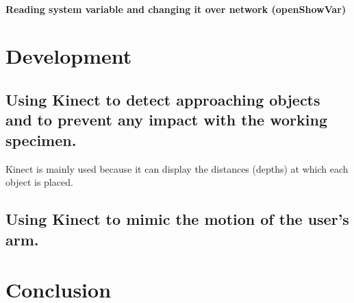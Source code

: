 \documentclass{book}
\begin{document}
				\subsubsection{Reading system variable and changing it over network (openShowVar)}
		
	\chapter{Development}
		\section{Using Kinect to detect approaching objects and to prevent any impact with the working specimen.}
		Kinect is mainly used because it can display the distances (depths) at which each object is placed.
		
		\section{Using Kinect to mimic the motion of the user’s arm.}
		
	\chapter{Conclusion}
		
\end{document}
